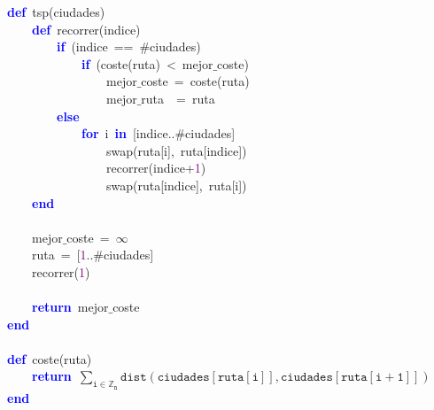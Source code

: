 \noindent
\mbox{}\textbf{\textcolor{Blue}{def}}\ tsp\textcolor{BrickRed}{(}ciudades\textcolor{BrickRed}{)} \\
\mbox{}\ \ \ \ \textbf{\textcolor{Blue}{def}}\ recorrer\textcolor{BrickRed}{(}indice\textcolor{BrickRed}{)} \\
\mbox{}\ \ \ \ \ \ \ \ \textbf{\textcolor{Blue}{if}}\ \textcolor{BrickRed}{(}indice\ \textcolor{BrickRed}{==}\ $\#$ciudades\textcolor{BrickRed}{)} \\
\mbox{}\ \ \ \ \ \ \ \ \ \ \ \ \textbf{\textcolor{Blue}{if}}\ \textcolor{BrickRed}{(}coste\textcolor{BrickRed}{(}ruta\textcolor{BrickRed}{)}\ \textcolor{BrickRed}{\textless{}}\ mejor$\_$coste\textcolor{BrickRed}{)} \\
\mbox{}\ \ \ \ \ \ \ \ \ \ \ \ \ \ \ \ mejor$\_$coste\ \textcolor{BrickRed}{=}\ coste\textcolor{BrickRed}{(}ruta\textcolor{BrickRed}{)} \\
\mbox{}\ \ \ \ \ \ \ \ \ \ \ \ \ \ \ \ mejor$\_$ruta\ \ \textcolor{BrickRed}{=}\ ruta \\
\mbox{}\ \ \ \ \ \ \ \ \textbf{\textcolor{Blue}{else}} \\
\mbox{}\ \ \ \ \ \ \ \ \ \ \ \ \textbf{\textcolor{Blue}{for}}\ i\ \textbf{\textcolor{Blue}{in}}\ \textcolor{BrickRed}{[}indice\textcolor{BrickRed}{..}$\#$ciudades\textcolor{BrickRed}{]} \\
\mbox{}\ \ \ \ \ \ \ \ \ \ \ \ \ \ \ \ swap\textcolor{BrickRed}{(}ruta\textcolor{BrickRed}{[}i\textcolor{BrickRed}{],}\ ruta\textcolor{BrickRed}{[}indice\textcolor{BrickRed}{])} \\
\mbox{}\ \ \ \ \ \ \ \ \ \ \ \ \ \ \ \ recorrer\textcolor{BrickRed}{(}indice\textcolor{BrickRed}{+}\textcolor{Purple}{1}\textcolor{BrickRed}{)} \\
\mbox{}\ \ \ \ \ \ \ \ \ \ \ \ \ \ \ \ swap\textcolor{BrickRed}{(}ruta\textcolor{BrickRed}{[}indice\textcolor{BrickRed}{],}\ ruta\textcolor{BrickRed}{[}i\textcolor{BrickRed}{])} \\
\mbox{}\ \ \ \ \textbf{\textcolor{Blue}{end}} \\
\mbox{} \\
\mbox{}\ \ \ \ mejor$\_$coste\ \textcolor{BrickRed}{=}\ $\infty$ \\
\mbox{}\ \ \ \ ruta\ \textcolor{BrickRed}{=}\ \textcolor{BrickRed}{[}\textcolor{Purple}{1}\textcolor{BrickRed}{..}$\#$ciudades\textcolor{BrickRed}{]} \\
\mbox{}\ \ \ \ recorrer\textcolor{BrickRed}{(}\textcolor{Purple}{1}\textcolor{BrickRed}{)} \\
\mbox{} \\
\mbox{}\ \ \ \ \textbf{\textcolor{Blue}{return}}\ mejor$\_$coste \\
\mbox{}\textbf{\textcolor{Blue}{end}} \\
\mbox{} \\
\mbox{}\textbf{\textcolor{Blue}{def}}\ coste\textcolor{BrickRed}{(}ruta\textcolor{BrickRed}{)} \\
\mbox{}\ \ \ \ \textbf{\textcolor{Blue}{return}}\ $\mathtt{\sum_{i \in \mathbb{Z}_n} dist(ciudades[ruta[i]], ciudades[ruta[i+1]])}$ \\
\mbox{}\textbf{\textcolor{Blue}{end}} \\
\mbox{}
